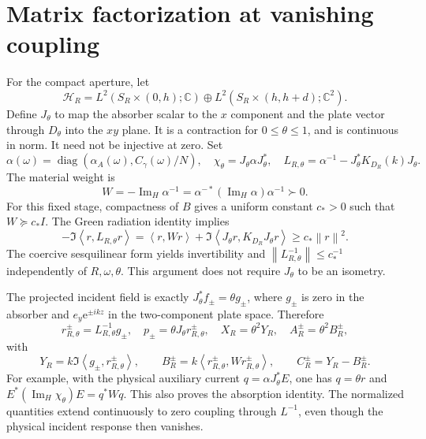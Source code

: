 \documentclass[11pt]{article}
\newcommand{\ImH}{\operatorname{Im}_{H}}
\newcommand{\norm}[1]{\left\lVert#1\right\rVert}
\newcommand{\ip}[2]{\left\langle#1,#2\right\rangle}
\newcommand{\ey}{e_y}
\newcommand{\ee}{\mathrm e}
\begin{document}
\section{Matrix factorization at vanishing coupling}
For the compact aperture, let
\[
 \mathcal H_R=L^2(S_R\times(0,h);\mathbb C)
 \oplus L^2(S_R\times(h,h+d);\mathbb C^2).
\]
Define $J_\theta$ to map the absorber scalar to the $x$ component and the
plate vector through $D_\theta$ into the $xy$ plane. It is a contraction for
$0\le\theta\le1$, and is continuous in norm. It need not be injective at zero.
Set
\[
 \alpha(\omega)=\operatorname{diag}(\alpha_A(\omega),C_\gamma(\omega)/N),
 \quad \chi_\theta=J_\theta\alpha J_\theta^*,\quad
 L_{R,\theta}=\alpha^{-1}-J_\theta^*K_{D_R}(k)J_\theta.
\]
The material weight is
\begin{equation}\label{eq:W}
 W=-\ImH\alpha^{-1}
   =\alpha^{-*}(\ImH\alpha)\alpha^{-1}\succ0.
\end{equation}
For this fixed stage, compactness of $B$ gives a uniform constant $c_*>0$
such that $W\succeq c_*I$. The Green radiation identity implies
\[
 -\Im\ip{r}{L_{R,\theta}r}
 =\ip{r}{Wr}+\Im\ip{J_\theta r}{K_{D_R}J_\theta r}
 \ge c_*\norm r^2.
\]
The coercive sesquilinear form yields invertibility and
$\norm{L_{R,\theta}^{-1}}\le c_*^{-1}$ independently of $R,\omega,\theta$.
This argument does not require $J_\theta$ to be an isometry.

The projected incident field is exactly $J_\theta^*f_\pm=\theta g_\pm$,
where $g_\pm$ is zero in the absorber and $\ey\ee^{\pm ikz}$ in the
two-component plate space. Therefore
\begin{equation}\label{eq:factorization}
 r_{R,\theta}^\pm=L_{R,\theta}^{-1}g_\pm,\quad
 p_\pm=\theta J_\theta r_{R,\theta}^\pm,\quad
 X_R=\theta^2Y_R,\quad A_R^\pm=\theta^2B_R^\pm,
\end{equation}
with
\[
 Y_R=k\Im\ip{g_\pm}{r_{R,\theta}^\pm},\qquad
 B_R^\pm=k\ip{r_{R,\theta}^\pm}{Wr_{R,\theta}^\pm},\qquad
 C_R^\pm=Y_R-B_R^\pm.
\]
For example, with the physical auxiliary current $q=\alpha J_\theta^*E$,
one has $q=\theta r$ and
$E^*(\ImH\chi_\theta)E=q^*Wq$. This also proves the absorption identity.
The normalized quantities extend continuously to zero coupling through
$L^{-1}$, even though the physical incident response then vanishes.
\end{document}
